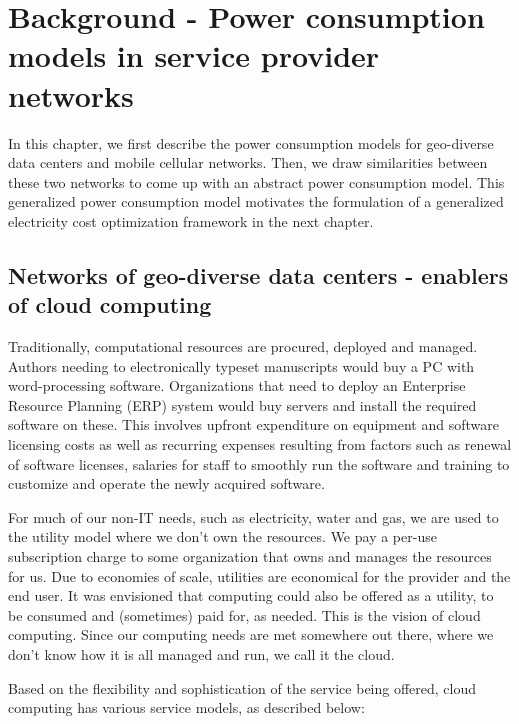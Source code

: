 \chapter{Background - Power consumption models in service provider networks}
\label{chap:background}
In this chapter, we first describe the power consumption models for geo-diverse data centers and mobile cellular networks. Then, we draw similarities between these two networks to come up with an abstract power consumption model. This generalized power consumption model motivates the formulation of a generalized electricity cost optimization framework in the next chapter. 

\section{Networks of geo-diverse data centers - enablers of cloud computing} Traditionally, computational resources are procured, deployed and managed. Authors needing to electronically typeset manuscripts would buy a PC with word-processing software. Organizations that need to deploy an Enterprise Resource Planning (ERP) system would buy servers and install the required software on these. This involves upfront expenditure on equipment and software licensing costs as well as recurring expenses resulting from factors such as renewal of software licenses, salaries for staff to smoothly run the software and training to customize and operate the newly acquired software. 

For much of our non-IT needs, such as electricity, water and gas, we are used to the utility model where we don't own the resources. We pay a per-use subscription charge to some organization that owns and manages the resources for us. Due to economies of scale, utilities are economical for the provider and the end user. It was envisioned that computing could also be offered as a utility, to be consumed and (sometimes) paid for, as needed. This is the vision of cloud computing. Since our computing needs are met somewhere out there, where we don't know how it is all managed and run, we call it the cloud.

Based on the flexibility and sophistication of the service being offered, cloud computing has various service models, as described below: 

